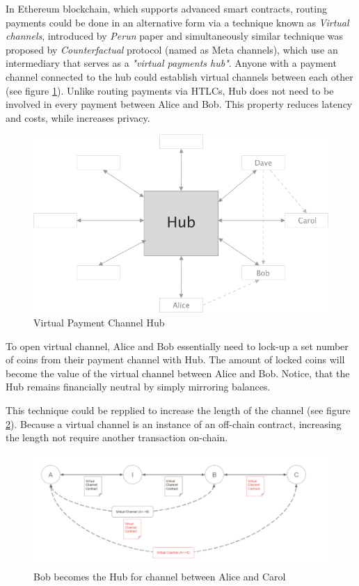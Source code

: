 \documentclass[a4paper,12pt]{article}
\begin{document}
In Ethereum blockchain, which supports advanced smart contracts, routing payments 
could be done in an alternative form via a technique known as \textit{Virtual 
channels}, introduced by \textit{Perun} paper \cite{perun} and simultaneously 
similar technique was proposed by \textit{Counterfactual} protocol (named as Meta 
channels), which use an intermediary that serves as a \textit{"virtual payments 
hub"}. Anyone with a payment channel connected to the hub could establish virtual
channels between each other (see figure \ref{img:hub}). Unlike routing payments 
via HTLCs, Hub does not need to be involved in every payment between Alice and 
Bob. This property reduces latency and costs, while increases privacy.

\begin{figure}[H]
    \centering
    \includegraphics[scale=0.5]{../img/hub}
    \caption{Virtual Payment Channel Hub}
    \label{img:hub}
\end{figure}

To open virtual channel, Alice and Bob essentially need to lock-up a set number
of coins from their payment channel with Hub. The amount of locked coins will 
become the value of the virtual channel between Alice and Bob. Notice, that the 
Hub remains financially neutral by simply mirroring balances.

This technique could be repplied to increase the length of the channel (see 
figure \ref{img:virtual-channels}). Because a virtual channel is an instance of 
an off-chain contract, increasing the length not require another transaction 
on-chain.

\begin{figure}[H]
    \centering
    \includegraphics[scale=0.6]{../img/virtual-channels}
    \caption{Bob becomes the Hub for channel between Alice and Carol}
    \label{img:virtual-channels}
\end{figure}
\end{document}

